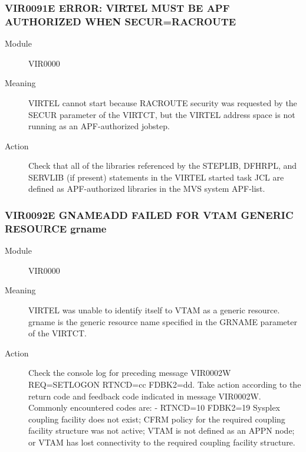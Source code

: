 \documentclass[letterpaper,10pt,english]{sphinxmanual}
\begin{document}
\subsubsection{VIR0091E ERROR: VIRTEL MUST BE APF AUTHORIZED WHEN SECUR=RACROUTE}
\label{\detokenize{messages:vir0091e-error-virtel-must-be-apf-authorized-when-secur-racroute}}\begin{description}
\item[{Module}] \leavevmode
VIR0000

\item[{Meaning}] \leavevmode
VIRTEL cannot start because RACROUTE security was requested by the SECUR parameter of the VIRTCT, but the VIRTEL address space is not running as an APF-authorized jobstep.

\item[{Action}] \leavevmode
Check that all of the libraries referenced by the STEPLIB, DFHRPL, and SERVLIB (if present) statements in the VIRTEL started task JCL are defined as APF-authorized libraries in the MVS system APF-list.

\end{description}


\subsubsection{VIR0092E GNAMEADD FAILED FOR VTAM GENERIC RESOURCE grname}
\label{\detokenize{messages:vir0092e-gnameadd-failed-for-vtam-generic-resource-grname}}\begin{description}
\item[{Module}] \leavevmode
VIR0000

\item[{Meaning}] \leavevmode
VIRTEL was unable to identify itself to VTAM as a generic resource. grname is the generic resource name specified in the GRNAME parameter of the VIRTCT.

\item[{Action}] \leavevmode
Check the console log for preceding message VIR0002W REQ=SETLOGON RTNCD=cc FDBK2=dd. Take action according to the return code and feedback code indicated in message VIR0002W. Commonly encountered codes are:
- RTNCD=10 FDBK2=19 Sysplex coupling facility does not exist; CFRM policy for the required coupling facility structure was not active; VTAM is not defined as an APPN node; or VTAM has lost connectivity to the required coupling facility structure.

\end{description}
\end{document}
